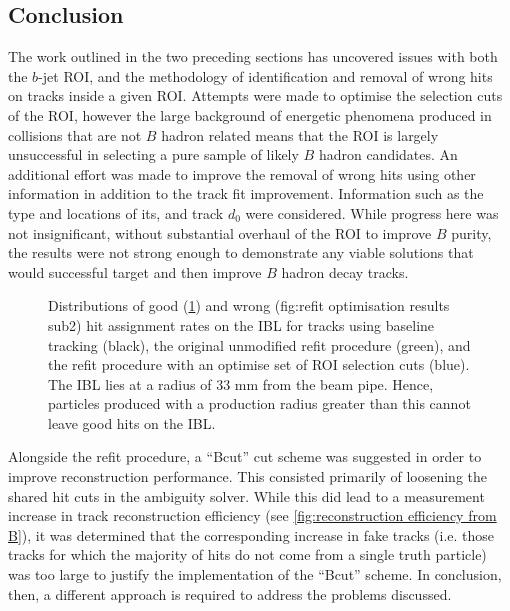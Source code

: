 \subsection{Conclusion}
The work outlined in the two preceding sections has uncovered issues with both the $b$-jet ROI, and the methodology of identification and removal of wrong hits on tracks inside a given ROI. Attempts were made to optimise the selection cuts of the ROI, however the large background of energetic phenomena produced in collisions that are not $B$ hadron related means that the ROI is largely unsuccessful in selecting a pure sample of likely $B$ hadron candidates. An additional effort was made to improve the removal of wrong hits using other information in addition to the track fit improvement. Information such as the type and locations of its, and track $d_0$ were considered. While progress here was not insignificant, without substantial overhaul of the ROI to improve $B$ purity, the results were not strong enough to demonstrate any viable solutions that would successful target and then improve $B$ hadron decay tracks.
%
\begin{figure}[!htbp]
    \centering
    \begin{subfigure}{.4\textwidth}
      \centering
      \caption{}
      \label{fig:refit optimisation results sub1}
    \end{subfigure}%
    \begin{subfigure}{.4\textwidth}
      \centering
      \caption{}
      \label{fig:refit optimisation results sub2}
    \end{subfigure}
    \caption{Distributions of good (\cref{fig:refit optimisation results sub1}) and wrong (fig:refit optimisation results sub2) hit assignment rates on the IBL for tracks using baseline tracking (black), the original unmodified refit procedure (green), and the refit procedure with an optimise set of ROI selection cuts (blue). The IBL lies at a radius of 33 mm from the beam pipe. Hence, particles produced with a production radius greater than this cannot leave good hits on the IBL.}
    \label{fig:refit optimisation results}
\end{figure}
%
Alongside the refit procedure, a ``Bcut'' cut scheme was suggested in order to improve reconstruction performance. This consisted primarily of loosening the shared hit cuts in the ambiguity solver. While this did lead to a measurement increase in track reconstruction efficiency (see \cref{fig:reconstruction efficiency from B}), it was determined that the corresponding increase in fake tracks (i.e. those tracks for which the majority of hits do not come from a single truth particle) was too large to justify the implementation of the ``Bcut'' scheme. In conclusion, then, a different approach is required to address the problems discussed.



